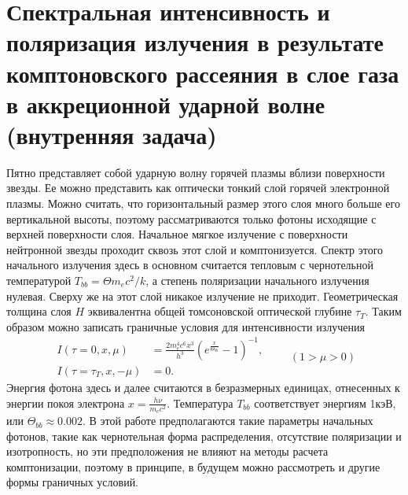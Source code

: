 \documentclass[14pt,a4paper]{extarticle}
\newcommand{\be}{\begin{equation}}
\newcommand{\ee}{\end{equation}}
\begin{document}
	\newpage


	\section{Спектральная интенсивность и поляризация излучения в результате комптоновского рассеяния в слое газа в аккреционной ударной волне (внутренняя задача)}\label{Spectra}
		Пятно представляет собой ударную волну горячей плазмы вблизи поверхности звезды.
		Ее можно представить как оптически тонкий слой горячей электронной плазмы. 
		Можно считать, что горизонтальный размер этого слоя много больше его вертикальной высоты, поэтому рассматриваются только фотоны исходящие с верхней поверхности слоя.
		Начальное мягкое излучение с поверхности нейтронной звезды проходит сквозь этот слой и комптонизуется. 
		Спектр этого начального излучения здесь в основном считается тепловым с чернотельной температурой $T_{bb}=\Theta m_ec^2/k$, а степень поляризации начального излучения нулевая. 
		Сверху же на этот слой никакое излучение не приходит.
		Геометрическая толщина слоя $H$ эквивалентна общей томсоновской оптической глубине $\tau_T$. 
		Таким образом можно записать граничные условия для интенсивности излучения
		\be\label{eq:conditions}
			\begin{split}
			 I(\tau=0,x,\mu)&=\frac{2m_e^4c^6x^3}{h^3}\left( e^{ \frac{x}{\Theta_{bb}}} - 1\right)^{-1},\\
			 I(\tau=\tau_T,x,-\mu)&=0.
			 \end{split} \qquad (1>\mu>0)
		\ee   
		Энергия фотона здесь и далее считаются в безразмерных единицах, отнесенных к энергии покоя электрона $x=\frac{h \nu}{m_ec^2}$. 
		Температура $T_{bb}$ соответствует энергиям 1кэВ, или $\Theta_{bb} \approx 0.002 $.
		В этой работе предполагаются такие параметры начальных фотонов, такие как чернотельная форма распределения, отсутствие поляризации и изотропность,
		но эти предположения не влияют на методы расчета комптонизации, поэтому в принципе, в будущем можно рассмотреть и другие формы граничных условий. 


		
\end{document}
